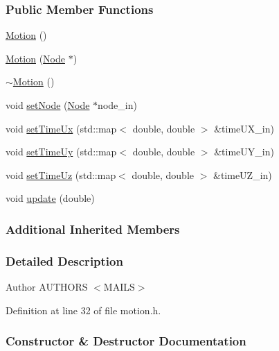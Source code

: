 \subsubsection*{Public Member Functions}
\begin{DoxyCompactItemize}
\item 
\hyperlink{classmknix_1_1_motion_a8786a52a159ebf5d19d12d67d68adf56}{Motion} ()
\item 
\hyperlink{classmknix_1_1_motion_a371a008f474a0f55cc657e0eba12e8d2}{Motion} (\hyperlink{classmknix_1_1_node}{Node} $\ast$)
\item 
\hyperlink{classmknix_1_1_motion_a090fafd3765c4f300704abdad2cbb438}{$\sim$\+Motion} ()
\item 
void \hyperlink{classmknix_1_1_motion_af98bd4bf8841d74e688eb74851ced978}{set\+Node} (\hyperlink{classmknix_1_1_node}{Node} $\ast$node\+\_\+in)
\item 
void \hyperlink{classmknix_1_1_motion_affdd1213b2fd7f9c44439068da55dcd0}{set\+Time\+Ux} (std\+::map$<$ double, double $>$ \&time\+U\+X\+\_\+in)
\item 
void \hyperlink{classmknix_1_1_motion_af23838c0a630566af75163cd678bffe6}{set\+Time\+Uy} (std\+::map$<$ double, double $>$ \&time\+U\+Y\+\_\+in)
\item 
void \hyperlink{classmknix_1_1_motion_afc339274d15271d0f99d3839e89e871a}{set\+Time\+Uz} (std\+::map$<$ double, double $>$ \&time\+U\+Z\+\_\+in)
\item 
void \hyperlink{classmknix_1_1_motion_a394f15ff3316a804176f0761abf66513}{update} (double)
\end{DoxyCompactItemize}
\subsubsection*{Additional Inherited Members}


\subsubsection{Detailed Description}
\begin{DoxyAuthor}{Author}
A\+U\+T\+H\+O\+R\+S $<$\+M\+A\+I\+L\+S$>$ 
\end{DoxyAuthor}


Definition at line 32 of file motion.\+h.



\subsubsection{Constructor \& Destructor Documentation}
\hypertarget{classmknix_1_1_motion_a8786a52a159ebf5d19d12d67d68adf56}{}
